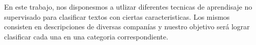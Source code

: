 En este trabajo, nos disponesmos a utlizar diferentes tecnicas de aprendisaje no supervisado para clasificar textos con ciertas caracteristicas. Los mismos consisten en descripciones de diversas companías y nuestro objetivo será lograr clasificar cada una en una categoria correspondiente.

